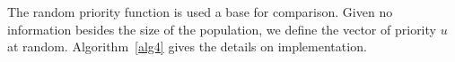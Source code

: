 The random priority function is used a base for comparison. Given no information besides the size of the population, we define the vector of priority $u$ at random. Algorithm~\ref{alg4} gives the details on implementation. 
%
%
%
%
% 
%




